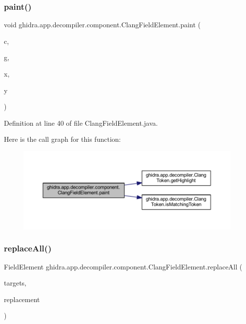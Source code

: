 \subsubsection{\texorpdfstring{paint()}{paint()}}
{\footnotesize\ttfamily void ghidra.\+app.\+decompiler.\+component.\+Clang\+Field\+Element.\+paint (\begin{DoxyParamCaption}\item[{J\+Component}]{c,  }\item[{Graphics}]{g,  }\item[{int}]{x,  }\item[{int}]{y }\end{DoxyParamCaption})\hspace{0.3cm}{\ttfamily [inline]}}



Definition at line 40 of file Clang\+Field\+Element.\+java.

Here is the call graph for this function\+:
\nopagebreak
\begin{figure}[H]
\begin{center}
\leavevmode
\includegraphics[width=350pt]{classghidra_1_1app_1_1decompiler_1_1component_1_1_clang_field_element_a29f41d0996ebfc39f427636021736ad4_cgraph}
\end{center}
\end{figure}
\mbox{\label{classghidra_1_1app_1_1decompiler_1_1component_1_1_clang_field_element_a2aeb0f4ecf97c903188cf0a973754a80}} 
\subsubsection{\texorpdfstring{replaceAll()}{replaceAll()}}
{\footnotesize\ttfamily Field\+Element ghidra.\+app.\+decompiler.\+component.\+Clang\+Field\+Element.\+replace\+All (\begin{DoxyParamCaption}\item[{char \mbox{[}$\,$\mbox{]}}]{targets,  }\item[{char}]{replacement }\end{DoxyParamCaption})\hspace{0.3cm}{\ttfamily [inline]}}



